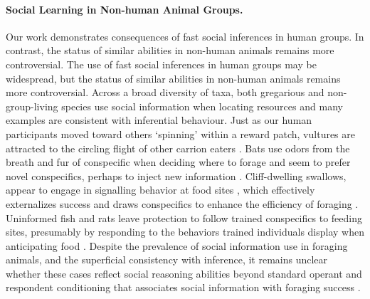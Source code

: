 \documentclass[12pt,letterpaper]{article}
\begin{document}










\paragraph{Social Learning in Non-human Animal Groups.}


Our work demonstrates consequences of fast social inferences in human groups. In contrast, the status of similar abilities in non-human animals remains more controversial.
The use of fast social inferences in human groups may be widespread, but the status of similar abilities in non-human animals remains more controversial.
Across a broad diversity of taxa, both gregarious and non-group-living species use social information when locating resources \cite{danchin2004public} and many examples are consistent with inferential behaviour.
Just as our human participants moved toward others `spinning’ within a reward patch, vultures are attracted to the circling flight of other carrion eaters \cite{kane2014vultures}. 
Bats use odors from the breath and fur of conspecific when deciding where to forage \cite{omara2014frugivorous}
and seem to prefer novel conspecifics, perhaps to inject new information \cite{ramakers2016frugivorous}.
Cliff-dwelling swallows, appear to engage in signalling behavior at food sites \cite{brown1988social,brown1991food}, which effectively externalizes success and draws conspecifics to enhance the efficiency of foraging \cite{torney2011signalling}.
Uninformed fish and rats leave protection to follow trained conspecifics to feeding sites, presumably by responding to the behaviors trained individuals display when anticipating food \cite{reebs2000can,bennett1997socially}.
Despite the prevalence of social information use in foraging animals, and the superficial consistency with inference, it remains unclear whether these cases reflect social reasoning abilities beyond standard operant and respondent conditioning that associates social information with foraging success \cite{galef2001social}.
\end{document}
